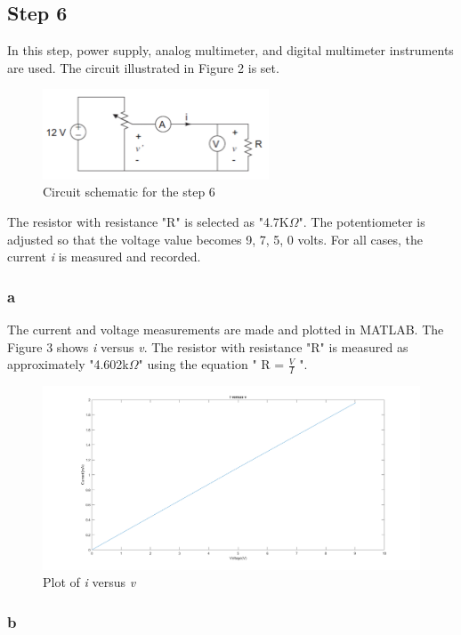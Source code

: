 \documentclass[letterpaper,12pt]{article}
\begin{document}
\subsection{Step 6}
In this step, power supply, analog multimeter, and digital multimeter instruments are used. The circuit illustrated in Figure 2 is set. 
\begin{figure}[H]
	\centering
	\includegraphics[width=0.6\textwidth]{6.png}
	\caption{Circuit schematic for the step 6}
\end{figure} 

The resistor with resistance "R" is selected as "4.7K\(\Omega\)". The potentiometer is adjusted so that the voltage value becomes 9, 7, 5, 0 volts. For all cases, the current \emph{i} is measured and recorded.

\subsubsection{a}
The current and voltage measurements are made and plotted in MATLAB. The Figure 3 shows  \emph{i} versus \emph{v}. The resistor with resistance "R" is measured as approximately "4.602k\(\Omega\)" using the equation " R  = \(\frac{V}{I}\) ".

\begin{figure}[H]
	\centering
	\includegraphics[width=1\textwidth]{6a.png}
	\caption{Plot of \emph{i} versus \emph{v}}
\end{figure} 


\subsubsection{b}
\end{document}
